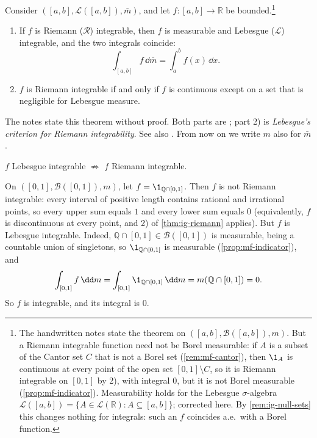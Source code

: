\begin{theorem}\label{thm:ig-riemann}
Consider $([a,b],\mathcal L([a,b]),\bar m)$, and let $f:[a,b]\to\mathbb R$ be
bounded.\footnote{The handwritten notes state the theorem on $([a,b],\mathcal B([a,b]),m)$.
But a Riemann integrable function need not be Borel measurable: if $A$ is a subset of the
Cantor set $C$ that is not a Borel set (\cref{rem:mf-cantor}), then $\1_A$ is continuous at
every point of the open set $[0,1]\setminus C$, so it is Riemann integrable on $[0,1]$ by 2),
with integral $0$, but it is not Borel measurable (\cref{prop:mf-indicator}). Measurability
holds for the Lebesgue $\sigma$-algebra $\mathcal L([a,b])=\{A\in\mathcal L(\mathbb
R):A\subseteq[a,b]\}$; corrected here. By \cref{rem:ig-null-sets} this changes nothing for
integrals: such an $f$ coincides a.e.\ with a Borel function.}
\begin{enumerate}[label=\arabic*)]
  \item If $f$ is Riemann ($\mathcal R$) integrable, then $f$ is measurable and Lebesgue
    ($\mathcal L$) integrable, and the two integrals coincide:
    \[
      \int_{[a,b]}f\,\dd\bar m=\int_a^bf(x)\,\dd x .
    \]
  \item $f$ is Riemann integrable if and only if $f$ is continuous except on a set that is
    negligible for Lebesgue measure.
\end{enumerate}
\end{theorem}

The notes state this theorem without proof. Both parts are \citet[Theorem~2.28]{folland};
part 2) is \emph{Lebesgue's criterion for Riemann integrability}. See also
\citet[Section~17]{billingsley}. From now on we write $m$ also for $\bar m$.

\begin{remark}\label{rem:ig-lebesgue-not-riemann}
$f$ Lebesgue integrable $\not\Rightarrow$ $f$ Riemann integrable.
\end{remark}

\begin{example}\label{exa:ig-dirichlet}
On $([0,1],\mathcal B([0,1]),m)$, let $f=\1_{\mathbb Q\cap[0,1]}$. Then $f$ is not Riemann
integrable: every interval of positive length contains rational and irrational points, so
every upper sum equals $1$ and every lower sum equals $0$ (equivalently, $f$ is discontinuous at
every point, and 2) of \cref{thm:ig-riemann} applies). But $f$ is Lebesgue integrable. Indeed,
$\mathbb Q\cap[0,1]\in\mathcal B([0,1])$ is measurable, being a countable union of singletons,
so $\1_{\mathbb Q\cap[0,1]}$ is measurable (\cref{prop:mf-indicator}), and
\[
  \int_{[0,1]}f\,\dd m=\int_{[0,1]}\1_{\mathbb Q\cap[0,1]}\,\dd m=m(\mathbb Q\cap[0,1])=0 .
\]
So $f$ is integrable, and its integral is $0$.
\end{example}

